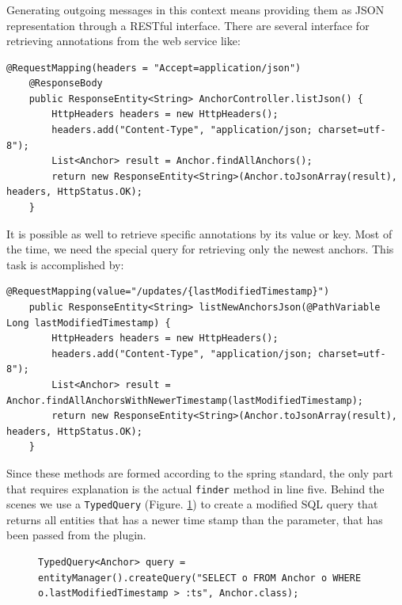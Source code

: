 \subsubsection[Generating Messages]{\reqWSvii}\label{reqWSvii}
Generating outgoing messages in this context means providing them as JSON representation through a RESTful interface. There are several interface for retrieving annotations from the web service like:
\begin{lstlisting}
@RequestMapping(headers = "Accept=application/json")
    @ResponseBody
    public ResponseEntity<String> AnchorController.listJson() {
        HttpHeaders headers = new HttpHeaders();
        headers.add("Content-Type", "application/json; charset=utf-8");
        List<Anchor> result = Anchor.findAllAnchors();
        return new ResponseEntity<String>(Anchor.toJsonArray(result), headers, HttpStatus.OK);
    }
\end{lstlisting}
It is possible as well to retrieve specific annotations by its value or key. Most of the time, we need the special query for retrieving only the newest anchors. This task is accomplished by:

\begin{lstlisting}
@RequestMapping(value="/updates/{lastModifiedTimestamp}")
    public ResponseEntity<String> listNewAnchorsJson(@PathVariable Long lastModifiedTimestamp) {
        HttpHeaders headers = new HttpHeaders();
        headers.add("Content-Type", "application/json; charset=utf-8");
        List<Anchor> result = Anchor.findAllAnchorsWithNewerTimestamp(lastModifiedTimestamp);
        return new ResponseEntity<String>(Anchor.toJsonArray(result), headers, HttpStatus.OK);
    }
\end{lstlisting}

Since these methods are formed according to the spring standard, the only part that requires explanation is the actual \verb^finder^ method in line five. Behind the scenes we use a \verb^TypedQuery^ (Figure. \ref{typed-query}) to create a modified SQL query that returns all entities that has a newer time stamp than the parameter, that has been passed from the plugin.

\begin{figure}\centering
\begin{lstlisting}
TypedQuery<Anchor> query = entityManager().createQuery("SELECT o FROM Anchor o WHERE o.lastModifiedTimestamp > :ts", Anchor.class);
\end{lstlisting}
\label{typed-query}
\end{figure} 

